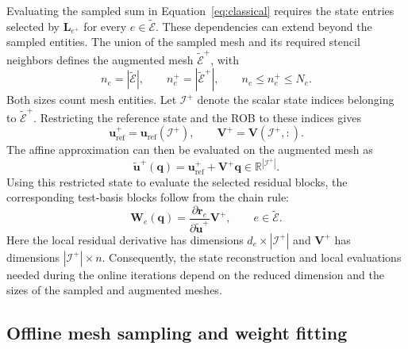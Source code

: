 \documentclass[a4paper,12pt]{article}
\newcommand{\vect}[1]{\boldsymbol{#1}}
\newcommand{\matr}[1]{\boldsymbol{#1}}
\begin{document}
Evaluating the sampled sum in Equation~\eqref{eq:classical} requires the state entries selected by $\matr{L}_{e^+}$ for every $e\in\widetilde{\mathcal E}$. These dependencies can extend beyond the sampled entities. The union of the sampled mesh and its required stencil neighbors defines the augmented mesh $\widetilde{\mathcal E}^{+}$, with
\begin{equation}
 n_e=|\widetilde{\mathcal E}|,\qquad
 n_e^+=|\widetilde{\mathcal E}^{+}|,\qquad n_e\leq n_e^+\leq N_e.
 \label{eq:mesh-sizes}
\end{equation}
Both sizes count mesh entities. Let $\mathcal I^+$ denote the scalar state indices belonging to $\widetilde{\mathcal E}^{+}$. Restricting the reference state and the ROB to these indices gives
\begin{equation}
 \vect{u}_{\mathrm{ref}}^+=\vect{u}_{\mathrm{ref}}(\mathcal I^+),\qquad
 \matr{V}^+=\matr{V}(\mathcal I^+,:).
 \label{eq:augmented-basis}
\end{equation}
The affine approximation can then be evaluated on the augmented mesh as
\begin{equation}
 \widetilde{\vect{u}}^+(\vect{q})
 =\vect{u}_{\mathrm{ref}}^++\matr{V}^+\vect{q}
 \in\mathbb R^{|\mathcal I^+|}.
 \label{eq:augmented-affine}
\end{equation}
Using this restricted state to evaluate the selected residual blocks, the corresponding test-basis blocks follow from the chain rule:
\begin{equation}
 \matr{W}_e(\vect{q})
 =\frac{\partial\vect{r}_e}{\partial\widetilde{\vect{u}}^+}
    \matr{V}^+,
 \qquad e\in\widetilde{\mathcal E}.
 \label{eq:local-test-basis}
\end{equation}
Here the local residual derivative has dimensions $d_e\times|\mathcal I^+|$ and $\matr{V}^+$ has dimensions $|\mathcal I^+|\times n$. Consequently, the state reconstruction and local evaluations needed during the online iterations depend on the reduced dimension and the sizes of the sampled and augmented meshes.

\subsection{Offline mesh sampling and weight fitting}
\end{document}

